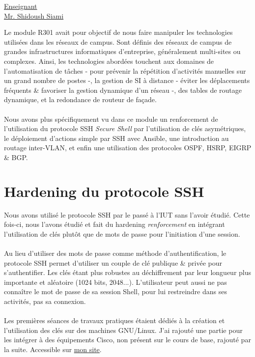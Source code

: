 \renewcommand{\figurename}{}

\vspace*{0.2cm}%
      \large
      \href{\@orientadorPagina}{\color{black}Enseignant\\Mr. Shidoush Siami}\\%
\vspace*{0.5cm}%

Le module R301 avait pour objectif de nous faire manipuler les technologies utilisées dans les réseaux de campus. Sont définis des réseaux de campus de grandes infrastructures informatiques d'entreprise, généralement multi-sites ou complexes. Ainsi, les technologies abordées touchent aux domaines de l'automatisation de tâches - pour prévenir la répétition d'activités manuelles sur un grand nombre de postes -, la gestion de SI à distance - éviter les déplacements fréquents \& favoriser la gestion dynamique d'un réseau -, des tables de routage dynamique, et la redondance de routeur de façade.
\\ \\
Nous avons plus spécifiquement vu dans ce module un renforcement de l'utilisation du protocole SSH \textit{Secure Shell} par l'utilisation de clés asymétriques, le déploiement d'actions simple par SSH avec Ansible, une introduction au routage inter-VLAN, et enfin une utilisation des protocoles OSPF, HSRP, EIGRP \& BGP.

\section{Hardening du protocole SSH}

Nous avons utilisé le protocole SSH par le passé à l'IUT sans l'avoir étudié. Cette fois-ci, nous l'avons étudié et fait du hardening \textit{renforcement} en intégrant l'utilisation de clés plutôt que de mots de passe pour l'initiation d'une session.
\\ \\
Au lieu d'utiliser des mots de passe comme méthode d'authentification, le protocole SSH permet d'utiliser un couple de clé publique \& privée pour s'authentifier. Les clés étant plus robustes au déchiffrement par leur longueur plus importante et aléatoire (1024 bits, 2048...). L'utilisateur peut aussi ne pas connaître le mot de passe de sa session Shell, pour lui restreindre dans ses activités, pas sa connexion.
\\ \\
Les premières séances de travaux pratiques étaient dédiés à la création et l'utilisation des clés sur des machines GNU/Linux. J'ai rajouté une partie pour les intégrer à des équipements Cisco, non présent sur le cours de base, rajouté par la suite. Accessible sur \href{https://xeylou.fr/posts/ssh-cisco-ios/}{mon site}.


